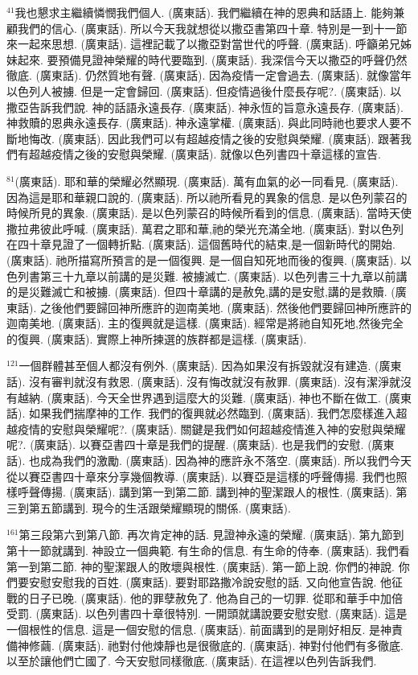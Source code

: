 \documentclass{book}
\begin{document}
$^{41}$我也懇求主繼續憐憫我們個人.
(廣東話).
我們繼續在神的恩典和話語上.
能夠兼顧我們的信心.
(廣東話).
所以今天我就想從以撒亞書第四十章.
特別是一到十一節來一起來思想.
(廣東話).
這裡記載了以撒亞對當世代的呼聲.
(廣東話).
呼籲弟兄姊妹起來.
要預備見證神榮耀的時代要臨到.
(廣東話).
我深信今天以撒亞的呼聲仍然徹底.
(廣東話).
仍然質地有聲.
(廣東話).
因為疫情一定會過去.
(廣東話).
就像當年以色列人被擄.
但是一定會歸回.
(廣東話).
但疫情過後什麼長存呢?.
(廣東話).
以撒亞告訴我們說.
神的話語永遠長存.
(廣東話).
神永恆的旨意永遠長存.
(廣東話).
神救贖的恩典永遠長存.
(廣東話).
神永遠掌權.
(廣東話).
與此同時祂也要求人要不斷地悔改.
(廣東話).
因此我們可以有超越疫情之後的安慰與榮耀.
(廣東話).
跟著我們有超越疫情之後的安慰與榮耀.
(廣東話).
就像以色列書四十章這樣的宣告.

$^{81}$(廣東話).
耶和華的榮耀必然顯現.
(廣東話).
萬有血氣的必一同看見.
(廣東話).
因為這是耶和華親口說的.
(廣東話).
所以祂所看見的異象的信息.
是以色列蒙召的時候所見的異象.
(廣東話).
是以色列蒙召的時候所看到的信息.
(廣東話).
當時天使撒拉弗彼此呼喊.
(廣東話).
萬君之耶和華,祂的榮光充滿全地.
(廣東話).
對以色列在四十章見證了一個轉折點.
(廣東話).
這個舊時代的結束,是一個新時代的開始.
(廣東話).
祂所描寫所預言的是一個復興.
是一個自知死地而後的復興.
(廣東話).
以色列書第三十九章以前講的是災難.
被擄滅亡.
(廣東話).
以色列書三十九章以前講的是災難滅亡和被擄.
(廣東話).
但四十章講的是赦免,講的是安慰,講的是救贖.
(廣東話).
之後他們要歸回神所應許的迦南美地.
(廣東話).
然後他們要歸回神所應許的迦南美地.
(廣東話).
主的復興就是這樣.
(廣東話).
經常是將祂自知死地,然後完全的復興.
(廣東話).
實際上神所揀選的族群都是這樣.
(廣東話).

$^{121}$一個群體甚至個人都沒有例外.
(廣東話).
因為如果沒有拆毀就沒有建造.
(廣東話).
沒有審判就沒有救恩.
(廣東話).
沒有悔改就沒有赦罪.
(廣東話).
沒有潔淨就沒有越納.
(廣東話).
今天全世界遇到這麼大的災難.
(廣東話).
神也不斷在做工.
(廣東話).
如果我們揣摩神的工作.
我們的復興就必然臨到.
(廣東話).
我們怎麼樣進入超越疫情的安慰與榮耀呢?.
(廣東話).
關鍵是我們如何超越疫情進入神的安慰與榮耀呢?.
(廣東話).
以賽亞書四十章是我們的提醒.
(廣東話).
也是我們的安慰.
(廣東話).
也成為我們的激勵.
(廣東話).
因為神的應許永不落空.
(廣東話).
所以我們今天從以賽亞書四十章來分享幾個教導.
(廣東話).
以賽亞是這樣的呼聲傳揚.
我們也照樣呼聲傳揚.
(廣東話).
講到第一到第二節.
講到神的聖潔跟人的根性.
(廣東話).
第三到第五節講到.
現今的生活跟榮耀顯現的關係.
(廣東話).

$^{161}$第三段第六到第八節.
再次肯定神的話.
見證神永遠的榮耀.
(廣東話).
第九節到第十一節就講到.
神設立一個典範.
有生命的信息.
有生命的侍奉.
(廣東話).
我們看第一到第二節.
神的聖潔跟人的敗壞與根性.
(廣東話).
第一節上說.
你們的神說.
你們要安慰安慰我的百姓.
(廣東話).
要對耶路撒冷說安慰的話.
又向他宣告說.
他征戰的日子已晚.
(廣東話).
他的罪孽赦免了.
他為自己的一切罪.
從耶和華手中加倍受罰.
(廣東話).
以色列書四十章很特別.
一開頭就講說要安慰安慰.
(廣東話).
這是一個根性的信息.
這是一個安慰的信息.
(廣東話).
前面講到的是剛好相反.
是神責備神修繭.
(廣東話).
祂對付他煉靜也是很徹底的.
(廣東話).
神對付他們有多徹底.
以至於讓他們亡國了.
今天安慰同樣徹底.
(廣東話).
在這裡以色列告訴我們.
\end{document}
